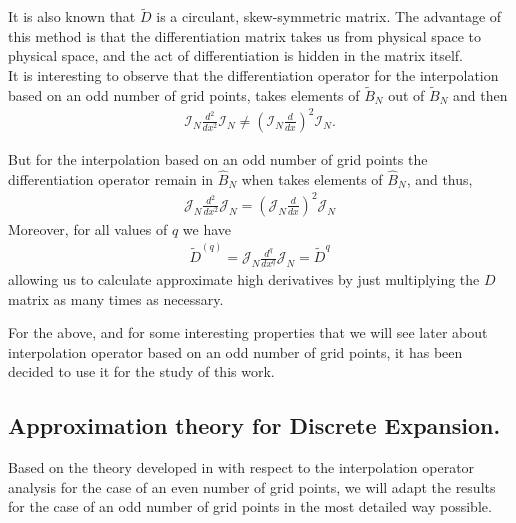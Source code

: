     It is also known that $\widetilde{D}$ is a circulant, skew-symmetric matrix. The advantage of this method is that the differentiation matrix takes us from physical space to physical space, and the act of differentiation is hidden in the matrix itself. \\
    
    It is interesting to observe that the differentiation operator for the interpolation based on an odd number of grid points, takes elements of $\widetilde{B}_N$ out of $\widetilde{B}_N$ and then
    \begin{align*}
    	\mathcal{I}_N \frac{d^2}{dx^2} \mathcal{I}_N \neq \left( \mathcal{I}_N \frac{d}{dx} \right)^2 \mathcal{I}_N.
    \end{align*}
	
	But for the interpolation based on an odd number of grid points the differentiation operator remain in $\hat{B}_N$ when takes elements of $\hat{B}_N$, and thus,
	\begin{align*}
		\mathcal{J}_N \frac{d^2}{dx^2} \mathcal{J}_N = \left( \mathcal{J}_N \frac{d}{dx} \right)^2 \mathcal{J}_N
	\end{align*}
    Moreover, for all values of $q$ we have
    \begin{align*}
        \widetilde{D}^{(q)} = \mathcal{J}_N \frac{d^q}{dx^q} \mathcal{J}_N = \widetilde{D}^q
    \end{align*}
	allowing us to calculate approximate high derivatives by just multiplying the $D$ matrix as many times as necessary.
    
    For the above, and for some interesting properties that we will see later about interpolation operator based on an odd number of grid points, it has been decided to use it for the study of this work.
    
    \subsection{Approximation theory for Discrete Expansion.}
    
    Based on the theory developed in \cite{gottlieb2007} with respect to the interpolation operator analysis for the case of an even number of grid points, we will adapt the results for the case of an odd number of grid points in the most detailed way possible. \\
    
